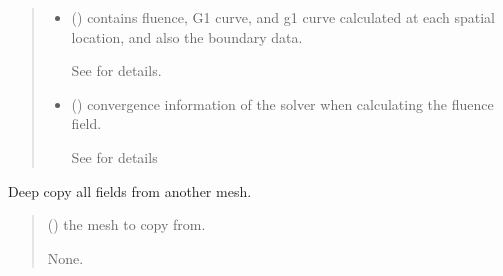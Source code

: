 \documentclass[letterpaper,10pt,english]{sphinxmanual}
\begin{document}
\begin{fulllineitems}
\begin{fulllineitems}
\begin{quote}
\begin{description}
\sphinxAtStartPar
\begin{itemize}
\item {} 
\sphinxAtStartPar
{} () \textendash{} contains fluence, G1 curve, and g1 curve calculated at each spatial location, and also the boundary data.

\sphinxAtStartPar
See {\hyperref[\detokenize{_autosummary/nirfasterff.base.data.DCSdata:nirfasterff.base.data.DCSdata}]{}} for details.

\item {} 
\sphinxAtStartPar
{} () \textendash{} convergence information of the solver when calculating the fluence field.

\sphinxAtStartPar
See {\hyperref[\detokenize{_autosummary/nirfasterff.utils.ConvergenceInfo:nirfasterff.utils.ConvergenceInfo}]{}} for details

\end{itemize}


\end{description}\end{quote}

\end{fulllineitems}


\begin{fulllineitems}
\label{\detokenize{_autosummary/nirfasterff.base.dcs_mesh.dcsmesh:nirfasterff.base.dcs_mesh.dcsmesh.from_copy}}
\pysigstartsignatures
\pysiglinewithargsret
{}
{}
{}
\pysigstopsignatures
\sphinxAtStartPar
Deep copy all fields from another mesh.
\begin{quote}\begin{description}
\sphinxAtStartPar
{} () \textendash{} the mesh to copy from.

\sphinxAtStartPar
None.

\end{description}\end{quote}


\end{fulllineitems}
\end{fulllineitems}
\end{document}
